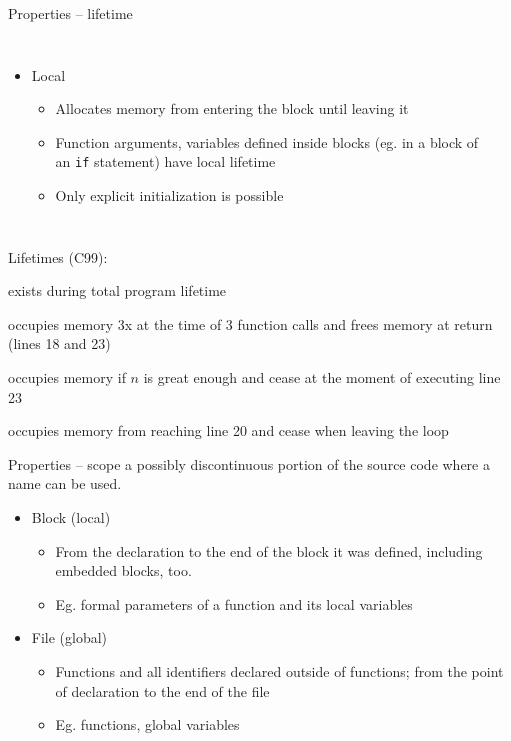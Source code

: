 \documentclass[usenames,dvipsnames,aspectratio=169]{beamer}
\begin{document}
\begin{frame}{Properties -- lifetime}
  \begin{columns}[T]
      \begin{itemize}
      \small
      \item Local
      \begin{itemize}
        \item Allocates memory from entering the block until leaving it
        \item Function arguments, variables defined inside blocks (eg. in a block of an \texttt{if} statement) have local lifetime
        \item Only explicit initialization is possible
      \end{itemize}
    \end{itemize}
      \begin{exampleblock}{}
        \tiny
        
      \end{exampleblock}
  \end{columns}
  \vfill
  \scriptsize
  Lifetimes (C99):
  \begin{description}[]
    \item[factorial] exists during total program lifetime
    \item[$n$] occupies memory 3x at the time of 3 function calls and frees memory at return (lines 18 and 23)
    \item[$f$] occupies memory if $n$ is great enough and cease at the moment of executing line 23
    \item[$i$] occupies memory from reaching line 20 and cease when leaving the loop
  \end{description}
\end{frame}

\begin{frame}{Properties -- scope}
   a possibly discontinuous portion of the source code where a name can be used.
  \begin{itemize}
    \item Block (local)
    \begin{itemize}
      \item From the declaration to the end of the block it was defined, including embedded blocks, too.
      \item Eg. formal parameters of a function and its local variables
    \end{itemize}
    \item File (global)
    \begin{itemize}
      \item Functions and all identifiers declared outside of functions; from the point of declaration to the end of the file
      \item Eg. functions, global variables
    \end{itemize}
  \end{itemize}
\end{frame}
\end{document}
